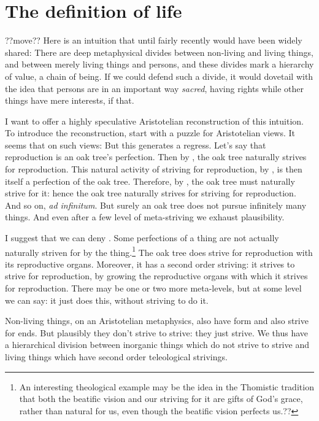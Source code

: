 \section{The definition of life}??move??
Here is an intuition that until fairly recently would have been widely shared: There are deep metaphysical divides between non-living and living things,
and between merely living things and persons, and these divides mark a hierarchy of value, a chain of being. If we could defend such a divide, it would
dovetail with the idea that persons are in an important way \textit{sacred}, having rights while other things have mere interests, if that.

I want to offer a highly speculative Aristotelian reconstruction of this intuition. To introduce the reconstruction, start with a puzzle for
Aristotelian views. It seems that on such views:
But this generates a regress. Let's say that reproduction is an oak tree's perfection. Then by , the oak tree naturally strives for
reproduction. This natural activity of striving for reproduction, by , is then itself a perfection of the oak tree. Therefore,
by , the oak tree must naturally strive for it: hence the oak tree naturally strives for striving for reproduction. And so on,
\textit{ad infinitum}. But surely an oak tree does not pursue infinitely many things. And even after a few level of meta-striving we exhaust plausibility.

I suggest that we can deny . Some perfections of a thing are not actually naturally striven for by the thing.\footnote{An interesting
theological example may be the idea in the Thomistic tradition that both the beatific vision and our striving for it are gifts of God's grace, rather than
natural for us, even though the beatific vision perfects us.??} The oak tree does strive for reproduction with its reproductive organs. Moreover, it has a
second order striving: it strives to strive for reproduction, by growing the reproductive organs with which it strives for reproduction. There may be one or
two more meta-levels, but at some level we can say: it just does this, without striving to do it.

Non-living things, on an Aristotelian metaphysics, also have form and also strive for ends. But plausibly they don't strive to strive: they just strive.
We thus have a hierarchical division between inorganic things which do not strive to strive and living things which have second order teleological strivings.

